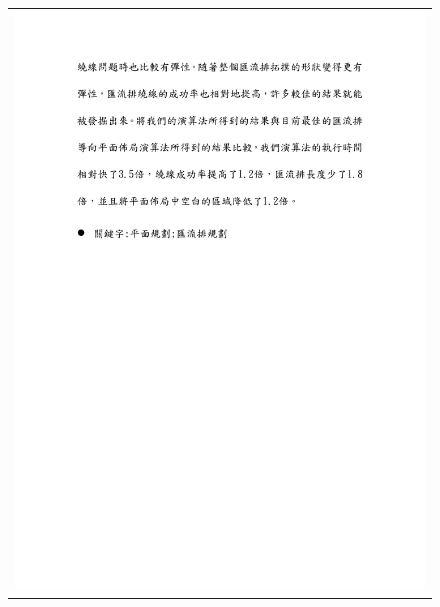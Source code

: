 \documentclass[12pt, a4paper]{report}
\begin{document}
\begin{figure}[h]
\centering
\vspace{-29mm}
\begin{tabular}{c}
\hspace{-36mm} \includegraphics[]{./abstract/ChineseAbstract2.pdf}
\end{tabular}
\end{figure}
\newpage
\newpage

\setcounter{page}{1}

%
%
\end{document}
